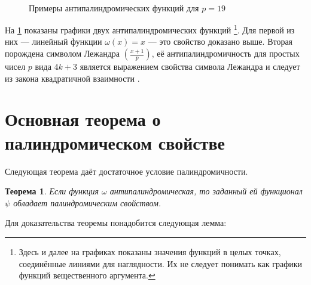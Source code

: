 \documentclass[14pt, a4paper, russian]{report}
\newtheorem{theorem}{\indent Теорема}
\begin{document}
\begin{figure}[!h]
    \\
    \caption{\footnotesize{Примеры антипалиндромических функций для $p=19$}}
\label{fig:antipalindromic}
\end{figure}

На \cref{fig:antipalindromic} показаны графики двух антипалиндромических функций \footnote{Здесь и далее на графиках показаны значения функций в целых точках, соединённые линиями для наглядности. Их не следует понимать как графики функций вещественного аргумента.}. Для первой из них --- линейный функции $\omega(x)=x$ --- это свойство доказано выше. Вторая порождена символом Лежандра $(\frac{x+1}{p})$, её антипалиндромичность для простых чисел $p$ вида $4k+3$ является выражением свойства символа Лежандра и следует из закона квадратичной взаимности \cite{vinogradov}.

\section{Основная теорема о палиндромическом свойстве}
Следующая теорема даёт достаточное условие палиндромичности.

\begin{theorem}\label{palindromic_theorem}
Если функция $\omega$ антипалиндромическая, то заданный ей функционал $\psi$ обладает палиндромическим свойством.
\end{theorem}

Для доказательства теоремы понадобится следующая лемма:
\end{document}
